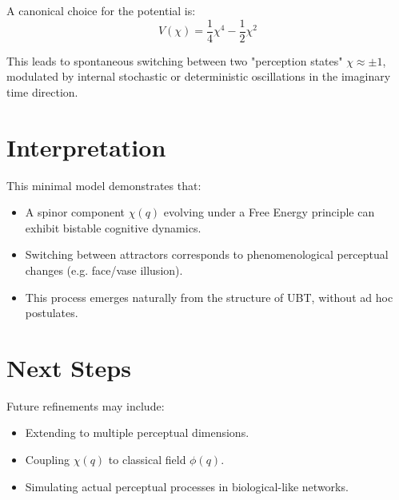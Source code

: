 \documentclass[12pt]{article}
\begin{document}
A canonical choice for the potential is:
\[
V(\chi) = \frac{1}{4} \chi^4 - \frac{1}{2} \chi^2
\]

This leads to spontaneous switching between two "perception states" \(\chi \approx \pm 1\), modulated by internal stochastic or deterministic oscillations in the imaginary time direction.

\section{Interpretation}
This minimal model demonstrates that:
\begin{itemize}
    \item A spinor component \(\chi(q)\) evolving under a Free Energy principle can exhibit bistable cognitive dynamics.
    \item Switching between attractors corresponds to phenomenological perceptual changes (e.g. face/vase illusion).
    \item This process emerges naturally from the structure of UBT, without ad hoc postulates.
\end{itemize}

\section{Next Steps}
Future refinements may include:
\begin{itemize}
    \item Extending to multiple perceptual dimensions.
    \item Coupling \(\chi(q)\) to classical field \(\phi(q)\).
    \item Simulating actual perceptual processes in biological-like networks.
\end{itemize}
\end{document}
